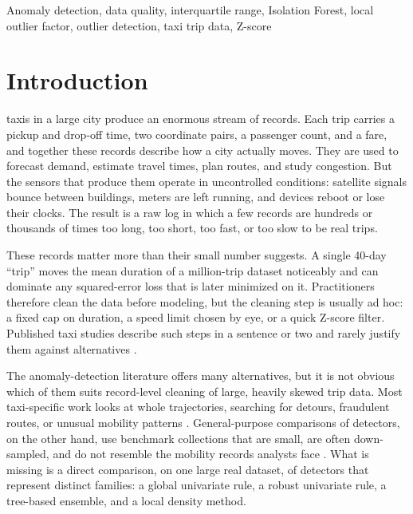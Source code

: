 \documentclass{ieeeaccess}
\begin{document}
\begin{keywords}
Anomaly detection, data quality, interquartile range, Isolation Forest, local outlier factor, outlier detection, taxi trip data, Z-score
\end{keywords}

\titlepgskip=-21pt

\maketitle

\section{Introduction}
\label{sec:introduction}
 taxis in a large city produce an enormous stream of records. Each trip carries a pickup and drop-off time, two coordinate pairs, a passenger count, and a fare, and together these records describe how a city actually moves. They are used to forecast demand, estimate travel times, plan routes, and study congestion. But the sensors that produce them operate in uncontrolled conditions: satellite signals bounce between buildings, meters are left running, and devices reboot or lose their clocks. The result is a raw log in which a few records are hundreds or thousands of times too long, too short, too fast, or too slow to be real trips.

These records matter more than their small number suggests. A single 40-day ``trip'' moves the mean duration of a million-trip dataset noticeably and can dominate any squared-error loss that is later minimized on it. Practitioners therefore clean the data before modeling, but the cleaning step is usually ad hoc: a fixed cap on duration, a speed limit chosen by eye, or a quick Z-score filter. Published taxi studies describe such steps in a sentence or two and rarely justify them against alternatives \cite{lam2015,schleibaum2022}.

The anomaly-detection literature offers many alternatives, but it is not obvious which of them suits record-level cleaning of large, heavily skewed trip data. Most taxi-specific work looks at whole trajectories, searching for detours, fraudulent routes, or unusual mobility patterns \cite{kong2024,huang2026,wang2018,eldawy2021}. General-purpose comparisons of detectors, on the other hand, use benchmark collections that are small, are often down-sampled, and do not resemble the mobility records analysts face \cite{goldstein2016,campos2016,han2022,bouman2024}. What is missing is a direct comparison, on one large real dataset, of detectors that represent distinct families: a global univariate rule, a robust univariate rule, a tree-based ensemble, and a local density method.
\end{document}
